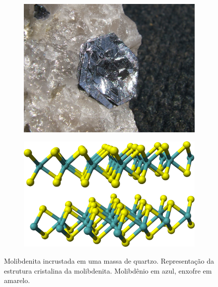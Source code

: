 \begin{figure}[ht]
  \begin{subfigure}{0.49\textwidth}
    \centering
    \includegraphics[width=1.0\linewidth]{imagens/molybdenite.jpeg}
    \caption{}
    \label{fig:mos2a}
  \end{subfigure}
  \begin{subfigure}{0.49\textwidth}
    \centering
    \includegraphics[width=1.0\linewidth]{imagens/molybdenite_crystal.png}
    \caption{}
    \label{fig:mos2b}
  \end{subfigure}
  \caption{
     Molibdenita incrustada em uma massa de quartzo.
     Representação da estrutura cristalina da molibdenita. Molibdênio em azul, enxofre em amarelo.
  }
  \label{fig:mos2}
\end{figure}

